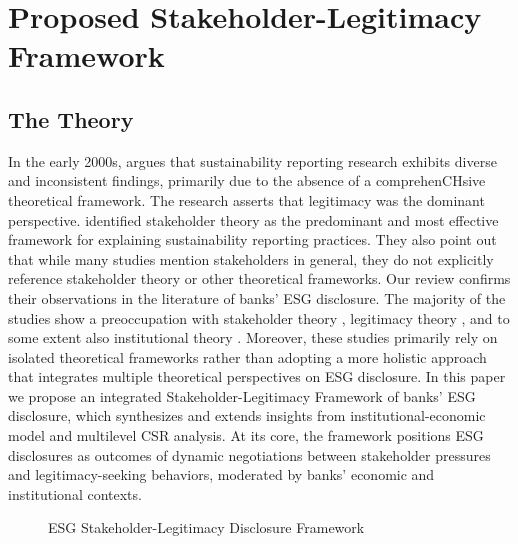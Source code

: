 \documentclass[
  authoryear]{elsarticle}
\makeatletter
\newcommand*\pandocbounded[1]{%
  \sbox\pandoc@box{#1}%
  \Gscale@div\@tempa{\textheight}{\dimexpr\ht\pandoc@box+\dp\pandoc@box\relax}%
  \Gscale@div\@tempb{\linewidth}{\wd\pandoc@box}%
  \ifdim\@tempb\p@<\@tempa\p@\let\@tempa\@tempb\fi%
  \ifdim\@tempa\p@<\p@\scalebox{\@tempa}{\usebox\pandoc@box}%
  \else\usebox{\pandoc@box}%
  \fi%
}
\makeatother
\begin{document}
\section{Proposed Stakeholder-Legitimacy
Framework}\label{proposed-stakeholder-legitimacy-framework}

\subsection{The Theory}\label{the-theory}

In the early 2000s, \citet{HOOGHIEMSTRA2000} argues that sustainability
reporting research exhibits diverse and inconsistent findings, primarily
due to the absence of a comprehenCHsive theoretical framework. The
research asserts that legitimacy was the dominant perspective.
\citet{SPENCE2010} identified stakeholder theory as the predominant and
most effective framework for explaining sustainability reporting
practices. They also point out that while many studies mention
stakeholders in general, they do not explicitly reference stakeholder
theory or other theoretical frameworks. Our review confirms their
observations in the literature of banks' ESG disclosure. The majority of
the studies show a preoccupation with stakeholder theory
\citep{GALANT2017, SHEN2016, BUALLAY2021}, legitimacy theory
\citep[e.g.][]{CARNEVALE2014}, and to some extent also institutional
theory \citep{HIGGINS2014, BEBBINGTON2018, CHRISTENSEN2021}. Moreover,
these studies primarily rely on isolated theoretical frameworks rather
than adopting a more holistic approach that integrates multiple
theoretical perspectives on ESG disclosure. In this paper we propose an
integrated Stakeholder-Legitimacy Framework of banks' ESG disclosure,
which synthesizes and extends insights from \citet{CAMPBELL2007}
institutional-economic model and \citet{AGUINIS2012} multilevel CSR
analysis. At its core, the framework positions ESG disclosures as
outcomes of dynamic negotiations between stakeholder pressures and
legitimacy-seeking behaviors, moderated by banks' economic and
institutional contexts.

\begin{figure}

\centering{

\pandocbounded{\texttt{[image: flowchart.pdf]}}

}

\caption{\label{fig-flowchart}ESG Stakeholder-Legitimacy Disclosure
Framework}

\end{figure}%
\end{document}
